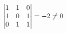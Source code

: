 \documentclass[preview]{standalone}
\begin{document}
\begin{align*}
\special{dvisvgm:raw <g id='unique000'>}\begin{vmatrix}1&1&0\\1&0&1\\0&1&1\end{vmatrix}=-2\ne 0\special{dvisvgm:raw </g>}
\end{align*}
\end{document}
